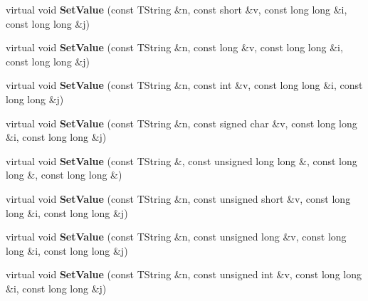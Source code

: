 \begin{DoxyCompactItemize}
\item 
\hypertarget{class_h_a_l_1_1_analysis_data_ad17c472ec1b6a6a0259c26bc5e1d68a9}{virtual void {\bfseries Set\-Value} (const T\-String \&n, const short \&v, const long long \&i, const long long \&j)}\label{class_h_a_l_1_1_analysis_data_ad17c472ec1b6a6a0259c26bc5e1d68a9}

\item 
\hypertarget{class_h_a_l_1_1_analysis_data_a4ab8550b85c33c0d04fcc381c845a5c4}{virtual void {\bfseries Set\-Value} (const T\-String \&n, const long \&v, const long long \&i, const long long \&j)}\label{class_h_a_l_1_1_analysis_data_a4ab8550b85c33c0d04fcc381c845a5c4}

\item 
\hypertarget{class_h_a_l_1_1_analysis_data_a9e7eea804e43369c4a4a8c3b1dacad37}{virtual void {\bfseries Set\-Value} (const T\-String \&n, const int \&v, const long long \&i, const long long \&j)}\label{class_h_a_l_1_1_analysis_data_a9e7eea804e43369c4a4a8c3b1dacad37}

\item 
\hypertarget{class_h_a_l_1_1_analysis_data_aebc6089b43396b0f19c1e06862be5448}{virtual void {\bfseries Set\-Value} (const T\-String \&n, const signed char \&v, const long long \&i, const long long \&j)}\label{class_h_a_l_1_1_analysis_data_aebc6089b43396b0f19c1e06862be5448}

\item 
\hypertarget{class_h_a_l_1_1_analysis_data_ae89756ae4ac0bf7cffbd22fbb54a2ec0}{virtual void {\bfseries Set\-Value} (const T\-String \&, const unsigned long long \&, const long long \&, const long long \&)}\label{class_h_a_l_1_1_analysis_data_ae89756ae4ac0bf7cffbd22fbb54a2ec0}

\item 
\hypertarget{class_h_a_l_1_1_analysis_data_a3f98354687b412c2fb8e84615211d314}{virtual void {\bfseries Set\-Value} (const T\-String \&n, const unsigned short \&v, const long long \&i, const long long \&j)}\label{class_h_a_l_1_1_analysis_data_a3f98354687b412c2fb8e84615211d314}

\item 
\hypertarget{class_h_a_l_1_1_analysis_data_af569db19521306fa14e85bd9d784a17f}{virtual void {\bfseries Set\-Value} (const T\-String \&n, const unsigned long \&v, const long long \&i, const long long \&j)}\label{class_h_a_l_1_1_analysis_data_af569db19521306fa14e85bd9d784a17f}

\item 
\hypertarget{class_h_a_l_1_1_analysis_data_a9c57d185dc584fdfb7f38b86e5f47f53}{virtual void {\bfseries Set\-Value} (const T\-String \&n, const unsigned int \&v, const long long \&i, const long long \&j)}\label{class_h_a_l_1_1_analysis_data_a9c57d185dc584fdfb7f38b86e5f47f53}


\end{DoxyCompactItemize}
